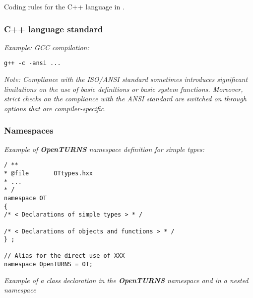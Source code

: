 
Coding rules for the C++ language in \OT.

\subsubsection{C++ language standard}

\emph{Example: GCC compilation:}
\lstset{language=C++, basicstyle=\normalsize}
\begin{lstlisting}[frame=TRBL]
g++ -c -ansi ...
\end{lstlisting}
\emph{Note: Compliance with the ISO/ANSI standard sometimes introduces significant limitations on the use of basic definitions or basic system functions. Moreover, strict checks on the compliance with the ANSI standard are switched on through options that are compiler-specific.}

\subsubsection{Namespaces}

\emph{Example of {\bf OpenTURNS} namespace definition for simple types:}
\lstset{language=C++, basicstyle=\normalsize}
\begin{lstlisting}[frame=TBRL]
/ **
* @file       OTtypes.hxx
* ...
* /
namespace OT
{
/* < Declarations of simple types > * /

/* < Declarations of objects and functions > * /
} ;

// Alias for the direct use of XXX
namespace OpenTURNS = OT;
\end{lstlisting}

\emph{Example of a class declaration in the {\bf OpenTURNS} namespace and in a nested namespace}

